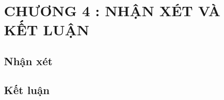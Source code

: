 \documentclass[14pt,a4paper]{article}
\begin{document}
\section*{CHƯƠNG 4 : NHẬN XÉT VÀ KẾT LUẬN}
\subsection{  Nhận xét}
\subsection{Kết luận}
\newpage
\end{document}
